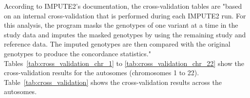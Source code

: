 
According to IMPUTE2's documentation, the cross-validation tables are "based on
an internal cross-validation that is performed during each IMPUTE2 run. For
this analysis, the program masks the genotypes of one variant at a time in the
study data and imputes the masked genotypes by using the remaining study and
reference data. The imputed genotypes are then compared with the original
genotypes to produce the concordance statistics."\\

Tables~\ref{tab:cross_validation_chr_1} to \ref{tab:cross_validation_chr_22}
show the cross-validation results for the autosomes (chromosomes 1 to 22).
Table~\ref{tab:cross_validation} shows the cross-validation results across the
autosomes.


